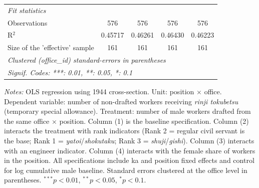 \begin{table}[htbp]
\begin{threeparttable}
\begin{tabular}{lcccc}
   \midrule
   \emph{Fit statistics}\\
   Observations                       & 576           & 576             & 576                & 576\\  
   R$^2$                              & 0.45717       & 0.46261         & 0.46430            & 0.46223\\  
   Size of the 'effective' sample     & 161           & 161             & 161                & 161\\  
   \midrule \midrule
   \multicolumn{5}{l}{\emph{Clustered (office\_id) standard-errors in parentheses}}\\
   \multicolumn{5}{l}{\emph{Signif. Codes: ***: 0.01, **: 0.05, *: 0.1}}\\
\end{tabular}
\begin{tablenotes}[flushleft]
\footnotesize
\item \textit{Notes:} OLS regression using 1944 cross-section. Unit: position $\times$ office. Dependent variable: number of non-drafted workers receiving \emph{rinji tokubetsu} (temporary special allowance). Treatment: number of male workers drafted from the same office $\times$ position. Column (1) is the baseline specification. Column (2) interacts the treatment with rank indicators (Rank 2 = regular civil servant is the base; Rank 1 = \emph{yatoi}/\emph{shokutaku}; Rank 3 = \emph{shuji}/\emph{gishi}). Column (3) interacts with an engineer indicator. Column (4) interacts with the female share of workers in the position. All specifications include ka and position fixed effects and control for log cumulative male baseline. Standard errors clustered at the office level in parentheses. $^{***}p<0.01$, $^{**}p<0.05$, $^{*}p<0.1$.
\end{tablenotes}
\end{threeparttable}
\end{table}
